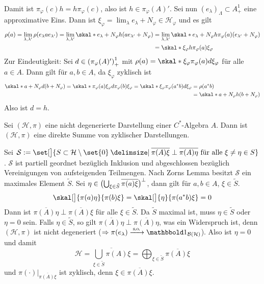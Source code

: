 \begin{beweis}
\begin{align}
	\end{align}
	Damit ist $\pi_\varphi(c) h = h \pi_\varphi(c)$, also ist $h \in \pi_\varphi(A)'$.
	Sei nun $(e_\lambda)_\Lambda \subset A^1_+$ eine approximative Eins. Dann ist $\xi_\varphi = \lim_\lambda e_\lambda+ N_\varphi \in \mathcal{H}_\varphi$ und es gilt
	\begin{align}
		\rho(a)= \lim_{\lambda,\lambda'} \rho \enbrace*{e_\lambda a e_{\lambda'}}= \lim_{\lambda,\lambda'} \skal*{e_\lambda + N_\varphi}{h(a e_{\lambda'}+ N_\varphi)}
		&= \lim_{\lambda,\lambda'} \skal*{e_\lambda+ N_\varphi}{h \pi_\varphi(a) (e_{\lambda'} + N_\varphi)} \\
		&= \skal*{\xi_\varphi}{h \pi_\varphi(a)\xi_\varphi}
	\end{align}
	Zur Eindeutigkeit: Sei $d \in \enbrace*{\pi_\varphi(A)'}^1_+$ mit $\rho(a)= \skal*{\xi_\varphi}{\pi_\varphi(a)d \xi_\varphi}$ für alle $a \in A$.
	Dann gilt für $a,b \in A$, da $\xi_\varphi$ zyklisch ist
	\begin{align}
		\skal*{a+ N_\varphi}{d(b+N_\varphi)} = \skal*{\pi_\varphi(a) \xi_\varphi}{d \pi_\varphi(b) \xi_\varphi} = \skal*{\xi_\varphi}{\pi_\varphi(a^*b)d \xi_\varphi} 
		&= \rho(a^*b) \\ &= \skal*{a+ N_\varphi}{h(b+N_\varphi)}
	\end{align}
	Also ist $d=h$.
\end{beweis}

\begin{satz}[{name=[Darstellung als direkte Summe]}]
	Sei $(\mathcal{H},\pi)$ eine nicht degenerierte Darstellung einer $C^*$-Algebra $A$.
	Dann ist $(\mathcal{H},\pi)$ eine direkte Summe von zyklischer Darstellungen.
\end{satz}
\begin{beweis}
	Sei $\mathcal{S} := \set[\big]{S \subset \mathcal{H}\setminus \set{0} \given {\overline{\pi(A) \xi}} \perp {\overline{\pi(A)\eta}} \text{ für alle }\xi \neq \eta \in S }$.
	$\mathcal{S}$ ist partiell geordnet bezüglich Inklusion und abgeschlossen bezüglich Vereinigungen von aufsteigenden Teilmengen.
	Nach Zorns Lemma besitzt $\mathcal{S}$ ein maximales Element $\tilde{S}$.
	Sei $\eta \in \enbrace[\big]{\bigcup_{\xi \in \tilde{S}} \overline{\pi(a)\xi}}^\bot$, dann gilt für $a,b \in A$, $\xi \in \tilde{S}$.
	\[
		\skal[\big]{\pi(a) \eta}{\pi(b)\xi} = \skal[\big]{\eta}{ \pi(a^*b)\xi} =0
	\]
	Dann ist $\overline{\pi(A)\eta} \perp \overline{\pi(A)\xi}$ für alle $\xi \in \tilde{S}$.
	Da $\tilde{S}$ maximal ist, muss $\eta \in \tilde{S}$ oder $\eta=0$ sein.
	Falls $\eta \in \tilde{S}$, so gilt $\overline{\pi(A)\eta}\perp \overline{\pi(A)\eta}$, was ein Widerspruch ist, denn $(\mathcal{H},\pi)$ ist nicht degeneriert ($\Rightarrow  \pi(e_\lambda)\grenzw{\so}\ind_{\mathcal{B}(\mathcal{H})}$).
	Also ist $\eta=0$ und damit
	\[
		\mathcal{H}= \overline{\bigcup_{\xi \in \tilde{S}} \pi(A)\xi} = \bigoplus_{\xi \in \tilde{S}} \overline{\pi(A)\xi}
	\]
	und $\pi(\cdot )\big|_{\overline{\pi(A)\xi}}$ ist zyklisch, denn $\xi \in \overline{\pi(A)\xi}$.
\end{beweis}

